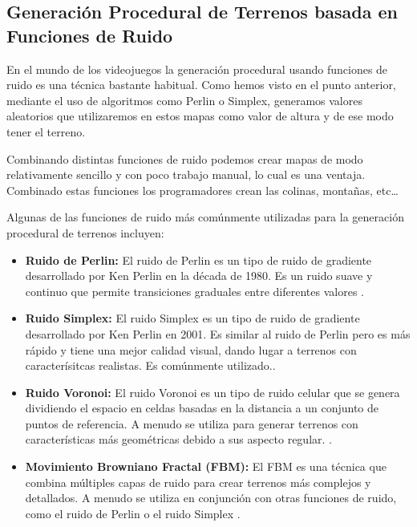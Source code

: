 \subsection{Generación Procedural de Terrenos basada en Funciones de Ruido}

En el mundo de los videojuegos la generación procedural usando funciones de ruido es una técnica bastante habitual. Como hemos visto en el punto anterior, mediante el uso de algoritmos como Perlin o Simplex, generamos valores aleatorios que utilizaremos en estos mapas como valor de altura y de ese modo tener el terreno.

Combinando distintas funciones de ruido podemos crear mapas de modo relativamente sencillo y con poco trabajo manual, lo cual es una ventaja. Combinado estas funciones los programadores crean las colinas, montañas, etc…

Algunas de las funciones de ruido más comúnmente utilizadas para la generación procedural de terrenos incluyen:
\begin{itemize}
    \item \textbf{Ruido de Perlin:} El ruido de Perlin es un tipo de ruido de gradiente desarrollado por Ken Perlin en la década de 1980. Es un ruido suave y continuo que permite transiciones graduales entre diferentes valores \cite{perlinnoise}.
    
    \item \textbf{Ruido Simplex:} El ruido Simplex es un tipo de ruido de gradiente desarrollado por Ken Perlin en 2001. Es similar al ruido de Perlin pero es más rápido y tiene una mejor calidad visual, dando lugar a terrenos con caracterísitcas realistas. Es comúnmente utilizado.\cite{simplexnoise}.
    
    \item \textbf{Ruido Voronoi:} El ruido Voronoi es un tipo de ruido celular que se genera dividiendo el espacio en celdas basadas en la distancia a un conjunto de puntos de referencia. A menudo se utiliza para generar terrenos con características más geométricas debido a sus aspecto regular. \cite{voronoinoise}.
        
    \item \textbf{Movimiento Browniano Fractal (FBM):} El FBM es una técnica que combina múltiples capas de ruido para crear terrenos más complejos y detallados. A menudo se utiliza en conjunción con otras funciones de ruido, como el ruido de Perlin o el ruido Simplex \cite{fbm}.
\end{itemize}

